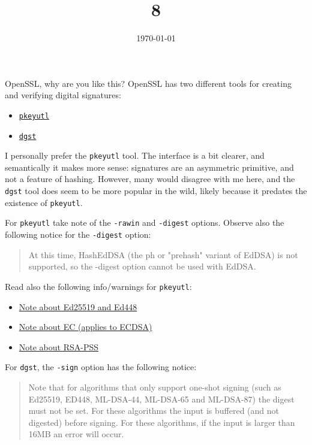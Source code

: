 \documentclass{practice}
\title{8}
\date{\today}
\begin{document}
\maketitle

\begin{task}{OpenSSL, why are you like this?}
  OpenSSL has two different tools for creating and verifying digital signatures:
  \begin{itemize}
    \item \href{https://docs.openssl.org/master/man1/openssl-pkeyutl/}{\texttt{pkeyutl}}
    \item \href{https://docs.openssl.org/master/man1/openssl-dgst/}{\texttt{dgst}}
  \end{itemize}

  I personally prefer the \texttt{pkeyutl} tool.
  The interface is a bit clearer, and semantically it makes more sense: signatures are an asymmetric primitive, and not a feature of hashing.
  However, many would disagree with me here, and the \texttt{dgst} tool does seem to be more popular in the wild, likely because it predates the existence of \texttt{pkeyutl}.

  For \texttt{pkeyutl} take note of the \texttt{-rawin} and \texttt{-digest} options.
  Observe also the following notice for the \texttt{-digest} option:
  \begin{quotation}
    At this time, HashEdDSA (the ph or "prehash" variant of EdDSA) is not supported, so the -digest option cannot be used with EdDSA.
  \end{quotation}

  Read also the following info/warnings for \texttt{pkeyutl}:
  \begin{itemize}
    \item \href{https://docs.openssl.org/master/man1/openssl-pkeyutl/#ed25519-and-ed448-algorithms}{Note about Ed25519 and Ed448}
    \item \href{https://docs.openssl.org/master/man1/openssl-pkeyutl/#ec-algorithm}{Note about EC (applies to ECDSA)}
    \item \href{https://docs.openssl.org/master/man1/openssl-pkeyutl/#rsa-pss-algorithm}{Note about RSA-PSS}
  \end{itemize}

  For \texttt{dgst}, the \texttt{-sign} option has the following notice:
  \begin{quotation}
    Note that for algorithms that only support one-shot signing (such as Ed25519, ED448, ML-DSA-44, ML-DSA-65 and ML-DSA-87) the digest must not be set. For these algorithms the input is buffered (and not digested) before signing. For these algorithms, if the input is larger than 16MB an error will occur.
  \end{quotation}
\end{task}
\end{document}
